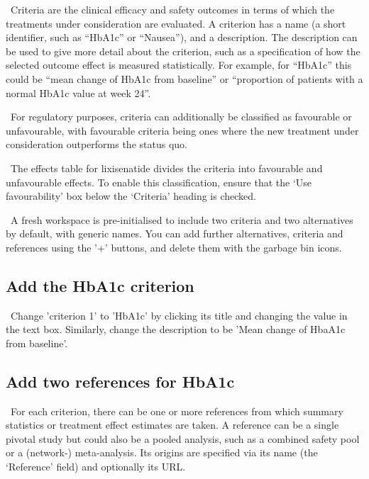 \documentclass[00_mcda_tutorial.tex]{subfiles}
\begin{document}
\noindent \faGraduationCap \, Criteria are the clinical efficacy and safety outcomes in terms of which the treatments under consideration are evaluated. A criterion has a name (a short identifier, such as  “HbA1c” or “Nausea”), and a description. The description can be used to give more detail about the criterion, such as a specification of how the selected outcome effect is measured statistically. For example, for “HbA1c” this could be “mean change of HbA1c from baseline” or “proportion of patients with a normal HbA1c value at week 24”.
\newline

\noindent \faGraduationCap \, For regulatory purposes, criteria can additionally be classified as favourable or unfavourable, with favourable criteria being ones where the new treatment under consideration outperforms the status quo.
\newline


\noindent \leftpointright \, The effects table for lixisenatide divides the criteria into favourable and unfavourable effects. To enable this classification, ensure that the ‘Use favourability’ box below the ‘Criteria’ heading is checked.
\newline

\noindent \faGraduationCap \, A fresh workspace is pre-initialised to include two criteria and two alternatives by default, with generic names. You can add further alternatives, criteria and references using the '+' buttons, and delete them with the garbage bin icons.

\subsection*{Add the HbA1c criterion}
\noindent \leftpointright \, Change 'criterion 1' to 'HbA1c' by clicking its title and changing the value in the text box. Similarly, change the description to be 'Mean change of HbaA1c from baseline'.

\subsection*{Add two references for HbA1c}
\noindent \faGraduationCap \, For each criterion, there can be one or more references from which summary statistics or treatment effect estimates are taken. A reference can be a single pivotal study but could also be a pooled analysis, such as a combined safety pool or a (network-) meta-analysis. Its origins are specified via its name (the ‘Reference’ field) and optionally its URL.
\newline
\end{document}
